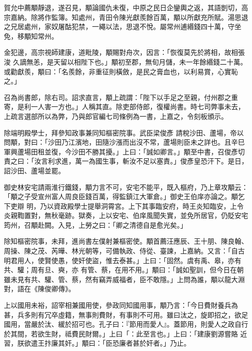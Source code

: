 \begin{pinyinscope}
 賀允中薦顒靜退，遂召見，顒論國仇未復，中原之民日企鑾輿之返，其語剴切，高宗嘉納。除將作監簿。知處州，青田令陳光獻羨餘百萬，顒以所獻充所賦。湯思退之兄居處州，家奴屠酤犯禁，一繩以法，思退不悅。屬常州逋緡錢四十萬，守坐免，移顒知常州。



 金犯邊，高宗視師建康，道毗陵，顒賜對舟次，因言：「恢復莫先於將相，故相張浚
 久謫無恙，是天留以相陛下也。」顒初至郡，無旬月儲，未一年餘緡錢二十萬。或勸獻羨，顒曰：「名羨餘，非重征則橫斂，是民之膏血也，以利易賞，心實恥之。」



 召為尚書郎，除右司。詔求直言，顒上疏謂：「陛下以手足之至親，付州郡之重寄，是利一人害一方也。」人稱其直。除吏部侍郎，復權尚書。時七司弊事未去，上疏言選部所以為弊，乃與郎官編七司條例為一書，上嘉之，令刻板頒示。



 除端明殿學士，拜參知政事兼同知樞密院事。武臣梁俊彥
 請稅沙田、蘆場，帝以問顒，對曰：「沙田乃江濱地，田隨沙漲而出沒不常，蘆場則臣未之詳也。且辛巳軍興蘆場田租並復，今沙田不勝其擾。」上曰：「誠如卿言。」顒至中書，召俊彥切責之曰：「汝言利求進，萬一為國生事，斬汝不足以塞責。」俊彥皇恐汗下。是日，詔沙田、蘆場並罷。



 御史林安宅請兩淮行鐵錢，顒力言不可，安宅不能平，既入樞府，乃上章攻顒云：「顒之子受宣州富人周良臣錢百萬，得監鎮江大軍倉。」御史王伯庠亦論之。顒乞下吏辯
 明，乃以資政殿學士提舉洞霄宮。上下其事臨安府，時王炎知臨安，上令炎親鞫置對，無秋毫跡。獄奏，上以安宅、伯庠風聞失實，並免所居官，仍貶安宅筠州，召顒赴闕。入見，上勞之曰：「卿之清德自是愈光矣。」



 除知樞密院事，未拜，進尚書左僕射兼樞密使。顒首薦汪應辰、王十朋、陳良翰、周操、陳之茂、芮曄、林光朝等，可備執政、侍從、臺諫，上嘉納。又言：「自古明君用人，使賢使愚，使奸使盜，惟去泰甚。」上曰：「固然。虞有禹、皋，亦有共、驩；周有旦、奭，亦
 有管、蔡，在用不用。」顒曰：「誠如聖訓，但今日在朝雖未見有共、驩、管、蔡，然有竊弄威福者，臣不敢隱。」上問為誰，顒以龍大淵對，語在《陳俊卿傳》。



 上以國用未裕，詔宰相兼國用使，參政同知國用事，顒乃言：「今日費財養兵為甚，兵多則有冗卒虛籍，無事則費財，有事則不可用。雖曰汰之，旋即招之，欲足國用，當嚴於汰、緩於招可也。孔子曰：『節用而愛人』。蓋節用，則愛人之政自行於其間，若欲生財，祗費民財爾。」上曰「：此至言也。」上曰：「建康劉源嘗賂
 近習，朕欲遣王抃廉其奸。」顒曰：「臣恐廉者甚於奸者。」乃止。




\end{pinyinscope}
